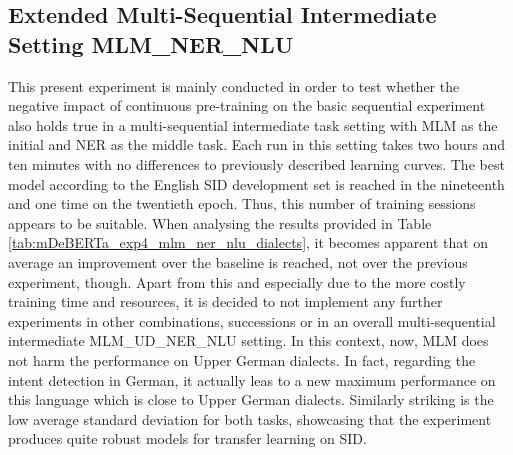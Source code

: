 \documentclass[11pt,a4paper,twoside,openright]{scrbook}
\begin{document}
\begin{table}[!ht]
\caption{Results the for extended multi-sequential intermediate UD\_NER\_NLU experiment with mDeBERTa according to Upper German dialects over three random seeds, Avg. = average on languages without English, German and Swiss German, Diff. = average performance difference to mDeBERTa baseline, sd = standard deviation}
\label{tab:mDeBERTa_exp4_ud_ner_nlu_dialects}
\end{table}






\subsection{Extended Multi-Sequential Intermediate Setting MLM\_NER\_NLU}

This present experiment is mainly conducted in order to test whether the negative impact of continuous pre-training on the basic sequential experiment also holds true in a multi-sequential intermediate task setting with MLM as the initial and NER as the middle task. Each run in this setting takes two hours and ten minutes with no differences to previously described learning curves. The best model according to the English SID development set is reached in the nineteenth and one time on the twentieth epoch. Thus, this number of training sessions appears to be suitable. When analysing the results provided in Table \ref{tab:mDeBERTa_exp4_mlm_ner_nlu_dialects}, it becomes apparent that on average an improvement over the baseline is reached, not over the previous experiment, though. Apart from this and especially due to the more costly training time and resources, it is decided to not implement any further experiments in other combinations, successions or in an overall multi-sequential intermediate MLM\_UD\_NER\_NLU setting. In this context, now, MLM does not harm the performance on Upper German dialects. In fact, regarding the intent detection in German, it actually leas to a new maximum performance on this language which is close to Upper German dialects. Similarly striking is the low average standard deviation for both tasks, showcasing that the experiment produces quite robust models for transfer learning on SID.
\end{document}
